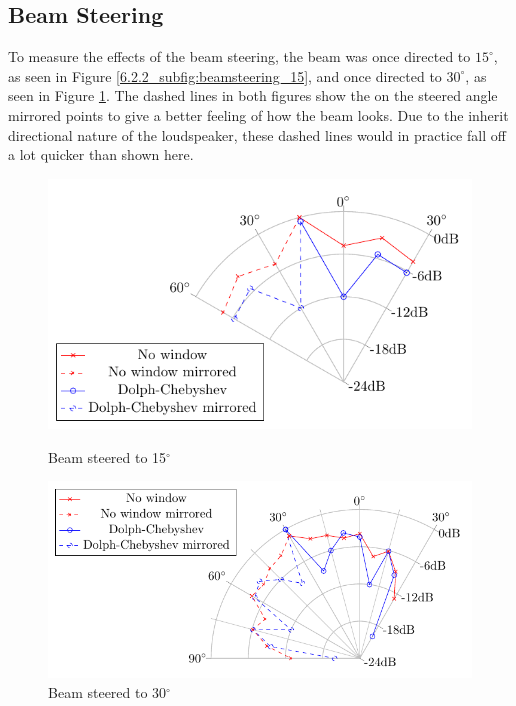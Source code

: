 \subsection{Beam Steering}
To measure the effects of the beam steering, the beam was once directed to $15^\circ$, as seen in Figure \ref{6.2.2_subfig:beamsteering_15}, and once directed to $30^\circ$, as seen in Figure \ref{6.2.2_subfig:beamsteering_30}. The dashed lines in both figures show the on the steered angle mirrored points to give a better feeling of how the beam looks. Due to the inherit directional nature of the loudspeaker, these dashed lines would in practice fall off a lot quicker than shown here. 
\begin{figure}[h!]
    \begin{minipage}{0.49\textwidth}
        \centering
        \includegraphics[width=\linewidth]{images/6_Measurements/Polar_PlotSteering_Measurement_15.pdf}
        \caption{Beam steered to 15$^\circ$}
        \label{6.2.2_subfig:beamsteering_15}
    \end{minipage}
    \begin{minipage}{0.49\textwidth}
        \centering
        \includegraphics[width=\linewidth]{images/6_Measurements/Polar_PlotSteering_Measurement_30.pdf}
        \caption{Beam steered to 30$^\circ$}
         \label{6.2.2_subfig:beamsteering_30}
    \end{minipage}
\end{figure}

